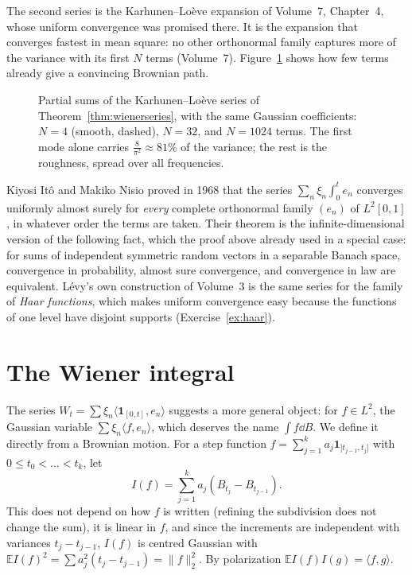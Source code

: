 The second series is the Karhunen--Lo\`eve expansion of Volume~7, Chapter~4, whose uniform convergence was promised there. It is the expansion that converges fastest in mean square: no other orthonormal
family captures more of the variance with its first $N$ terms (Volume~7). Figure~\ref{fig:wienerseries} shows how few terms already give a convincing Brownian path.

\begin{figure}[ht]
\centering
{}
\caption{Partial sums of the Karhunen--Lo\`eve series of Theorem~\ref{thm:wienerseries}, with the same Gaussian coefficients: $N=4$ (smooth, dashed), $N=32$, and $N=1024$ terms. The first mode alone carries
$\frac8{\pi^2}\approx81\%$ of the variance; the rest is the roughness, spread over all frequencies.}
\label{fig:wienerseries}
\end{figure}

\begin{remark}
Kiyosi It\^o and Makiko Nisio proved in 1968 that the series $\sum_n\xi_n\int_0^te_n$ converges uniformly almost surely for \emph{every} complete orthonormal family $(e_n)$ of $L^2[0,1]$, in whatever order the terms are taken.
Their theorem is the infinite-dimensional version of the following fact, which the proof above already used in a special case: for sums of independent symmetric random vectors in a separable Banach space,
convergence in probability, almost sure convergence, and convergence in law are equivalent. L\'evy's own construction of Volume~3 is the same series for the family of \emph{Haar functions}, which makes uniform
convergence easy because the functions of one level have disjoint supports (Exercise~\ref{ex:haar}).
\end{remark}

\section{The Wiener integral}\label{sec:wienerint}

The series $W_t=\sum\xi_n\langle\mathbf 1_{[0,t]},e_n\rangle$ suggests a more general object: for $f\in L^2$, the Gaussian variable $\sum\xi_n\langle f,e_n\rangle$, which deserves the name $\int f\dd B$. We define it
directly from a Brownian motion. For a step function $f=\sum_{j=1}^ka_j\mathbf 1_{]t_{j-1},t_j]}$ with $0\le t_0<\dots<t_k$, let
\[
I(f)=\sum_{j=1}^ka_j(B_{t_j}-B_{t_{j-1}}).
\]
This does not depend on how $f$ is written (refining the subdivision does not change the sum), it is linear in $f$, and since the increments are independent with variances $t_j-t_{j-1}$, $I(f)$ is centred
Gaussian with $\mathbb E I(f)^2=\sum a_j^2(t_j-t_{j-1})=\|f\|_2^2$. By polarization $\mathbb E I(f)I(g)=\langle f,g\rangle$.

